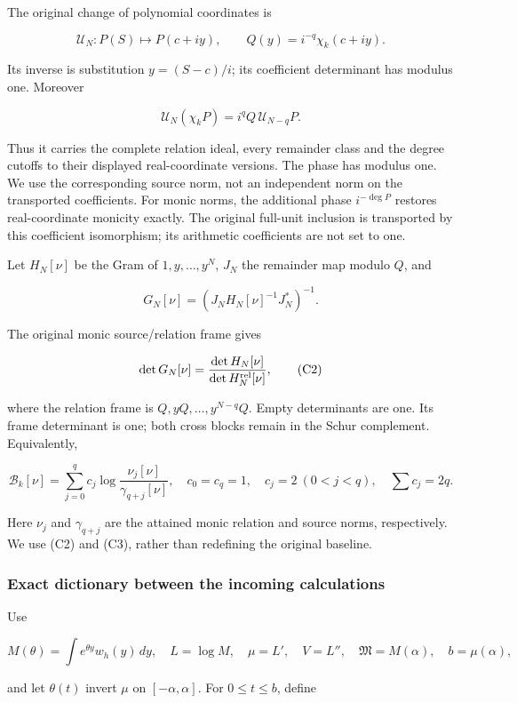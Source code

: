 The original change of polynomial coordinates is

\[
\mathcal U_N:P(S)\longmapsto P(c+iy),\qquad
Q(y)=i^{-q}\chi_k(c+iy).
\tag{C1}
\]

Its inverse is substitution \(y=(S-c)/i\); its coefficient determinant has modulus one. Moreover

\[
\mathcal U_N(\chi_kP)=i^q Q\,\mathcal U_{N-q}P.
\]

Thus it carries the complete relation ideal, every remainder class and the degree cutoffs to their displayed real-coordinate versions. The phase has modulus one. We use the corresponding source norm, not an independent norm on the transported coefficients. For monic norms, the additional phase \(i^{-\deg P}\) restores real-coordinate monicity exactly. The original full-unit inclusion is transported by this coefficient isomorphism; its arithmetic coefficients are not set to one.

Let \(H_N[\nu]\) be the Gram of \(1,y,\ldots,y^N\), \(J_N\) the remainder map modulo \(Q\), and

\[
G_N[\nu]=(J_NH_N[\nu]^{-1}J_N^*)^{-1}.
\]

The original monic source/relation frame gives

\[
\det G_N[\nu]=\frac{\det H_N[\nu]}{\det H_N^{\rm rel}[\nu]},
\tag{C2}
\]

where the relation frame is \(Q,yQ,\ldots,y^{N-q}Q\). Empty determinants are one. Its frame determinant is one; both cross blocks remain in the Schur complement. Equivalently,

\[
\mathcal B_k[\nu]=\sum_{j=0}^q c_j
\log\frac{\nu_j[\nu]}{\gamma_{q+j}[\nu]},\quad
c_0=c_q=1,\quad c_j=2\ (0<j<q),\quad \sum c_j=2q.
\tag{C3}
\]

Here \(\nu_j\) and \(\gamma_{q+j}\) are the attained monic relation and source norms, respectively. We use (C2) and (C3), rather than redefining the original baseline.

\subsubsection{Exact dictionary between the incoming calculations}\label{exact-dictionary-between-the-incoming-calculations}

Use

\[
M(\theta)=\int e^{\theta y}w_h(y)\,dy,\quad L=\log M,
\quad \mu=L',\quad V=L'',\quad
\mathfrak M=M(\alpha),\quad b=\mu(\alpha),
\]

and let \(\theta(t)\) invert \(\mu\) on \([-\alpha,\alpha]\). For \(0\le t\le b\), define

